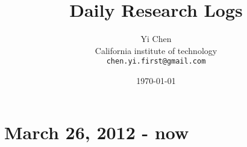 \documentclass[12pt,a4paper,onecolumn]{report}
\begin{document}
\author{Yi Chen\\
   California institute of technology\\
   \texttt{chen.yi.first@gmail.com}}
\title{Daily Research Logs}
\date{\today}
\maketitle

\newcommand{\DailyTitle}[1]{\section{#1}}
\newcommand{\DailySection}[1]{\subsection{#1}}
\newcommand{\DailySubSection}[1]{\subsubsection{#1}}

\newcommand{\ActionItem}{{\color{lavender} \sc (action item)}}
\newcommand{\MR}{$M_R$~}
\newcommand{\R}{$R$~}
\newcommand{\RSquare}{$R^2$~}
\newcommand{\PT}{$p_T$~}

\newcommand{\tweakedtilde}{{\raise.17ex\hbox{$\scriptstyle\sim$}}}

\setcounter{secnumdepth}{4}
\setcounter{tocdepth}{4}

\tableofcontents

\chapter{March 26, 2012 - now}


% 


\end{document}
